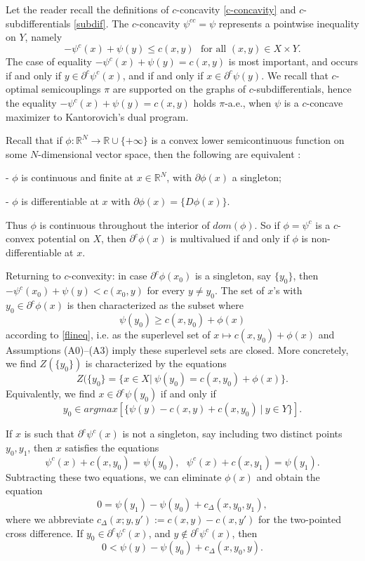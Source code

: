 \documentclass[12pt]{amsart}
\theoremstyle{definition}
\theoremstyle{remark}
\newcommand{\bR}{\mathbb{R}}
\newcommand{\del}{\partial}
\newcommand{\cd}{c_\Delta}
\begin{document}
Let the reader recall the definitions of $c$-concavity \ref{c-concavity} and $c$-subdifferentials \ref{subdif}. The $c$-concavity $\psi^{cc}=\psi$ represents a pointwise inequality on $Y$, namely \begin{equation}\label{flineq}-\psi^c(x)+\psi(y) \leq c(x,y) \text{~~for all~} (x,y)\in X\times Y.\end{equation} The case of equality $-\psi^c(x)+\psi(y) = c(x,y)$ is most important, and occurs if and only if $y\in \del^c \psi^c (x)$, and if and only if $x \in \del^c \psi(y)$. We recall that $c$-optimal semicouplings $\pi$ are supported on the graphs of $c$-subdifferentials,  hence the equality $-\psi^c(x)+\psi(y)=c(x,y)$ holds $\pi$-a.e., when $\psi$ is a $c$-concave maximizer to Kantorovich's dual program.  

Recall that if $\phi: \bR^N \to \bR \cup \{+\infty\}$ is a convex lower semicontinuous function on some $N$-dimensional vector space, then the following are equivalent \cite[I.5.3, pp.23]{ET}: 

- $\phi$ is continuous and finite at $x\in \bR^N$, with $\del \phi(x)$ a singleton; 

- $\phi$ is differentiable at $x$ with $\del \phi(x)=\{D\phi(x)\}$.

Thus $\phi$ is continuous throughout the interior of $dom(\phi)$. So if $\phi=\psi^c$ is a $c$-convex potential on $X$, then $\del^c \phi(x)$ is multivalued if and only if $\phi$ is non-differentiable at $x$. 

Returning to $c$-convexity: in case $\del^c \phi(x_0)$ is a singleton, say $\{y_0\}$, then $-\psi^c(x_0)+\psi(y)<c(x_0,y)$ for every $y\neq y_0$. The set of $x$'s with $y_0\in \del^c\phi(x)$ is then characterized as the subset where $$\psi(y_0) \geq c(x,y_0)+\phi(x)$$ according to \eqref{flineq}, i.e. as the superlevel set of $x\mapsto c(x,y_0)+\phi(x)$ and Assumptions (A0)--(A3) imply these superlevel sets are closed. More concretely, we find $Z(\{y_0\})$ is characterized by the equations \begin{equation} Z(\{y_0\}=\{x \in X|~\psi(y_0)=c(x,y_0)+\phi(x)\}.\label{singlesub} \end{equation} Equivalently,  we find $x\in \del^c \psi(y_0)$ if and only if \begin{equation} y_0\in argmax[\{ \psi(y) - c(x,y)+c(x,y_0)~|~ y\in Y \}]. \label{yy}\end{equation}


If $x$ is such that $\del^c \psi^c(x)$ is not a singleton, say including two distinct points $y_0,y_1$, then $x$ satisfies the equations $$\psi^c(x)+c(x,y_0)=\psi(y_0), ~~~\psi^c(x)+c(x,y_1)=\psi(y_1).$$ Subtracting these two equations, we can eliminate $\phi(x)$ and obtain the equation $$0=\psi(y_1)-\psi(y_0)+\cd(x,y_0,y_1),$$ where we abbreviate $c_\Delta(x;y, y'):=c(x,y)-c(x,y')$ for the two-pointed cross difference. If $y_0\in \del^c \psi^c(x)$, and $y\notin \del^c \psi^c(x)$, then $$0<\psi(y)-\psi(y_0)+\cd(x,y_0,y).$$ %
\end{document}
